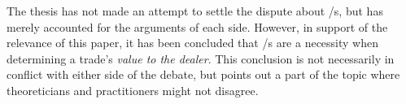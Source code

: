 \documentclass[main.tex]{subfiles}
\begin{document}
    The thesis has not made an attempt to settle the dispute about \FVA/s,
    but has merely accounted for the arguments of each side.
    However, in support of the relevance of this paper,
    it has been concluded that \FVA/s are a necessity 
    when determining a trade's \textit{value to the dealer}.
    This conclusion is not necessarily in conflict with either side of the debate,
    but points out a part of the topic where theoreticians and practitioners might not disagree.

    \textbf{\researchQuestionFvaImplications}
\end{document}
